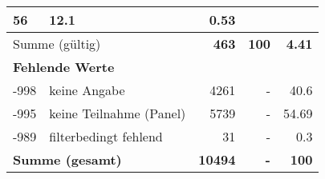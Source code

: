 \begin{longtable}{lXrrr}
       \num{56} &
       \num[round-mode=places,round-precision=2]{12.1} &
         \num[round-mode=places,round-precision=2]{0.53} \\
     \midrule
     \multicolumn{2}{l}{Summe (gültig)} &
       \textbf{\num{463}} &
     \textbf{\num{100}} &
       \textbf{\num[round-mode=places,round-precision=2]{4.41}} \\
     \multicolumn{5}{l}{\textbf{Fehlende Werte}}\\
       -998 &
       keine Angabe &
         \num{4261} &
        - &
         \num[round-mode=places,round-precision=2]{40.6} \\
       -995 &
       keine Teilnahme (Panel) &
         \num{5739} &
        - &
         \num[round-mode=places,round-precision=2]{54.69} \\
       -989 &
       filterbedingt fehlend &
         \num{31} &
        - &
         \num[round-mode=places,round-precision=2]{0.3} \\
     \midrule
     \multicolumn{2}{l}{\textbf{Summe (gesamt)}} &
          \textbf{\num{10494}} &
        \textbf{-} &
        \textbf{\num{100}} \\
     \bottomrule
     \end{longtable}
     
